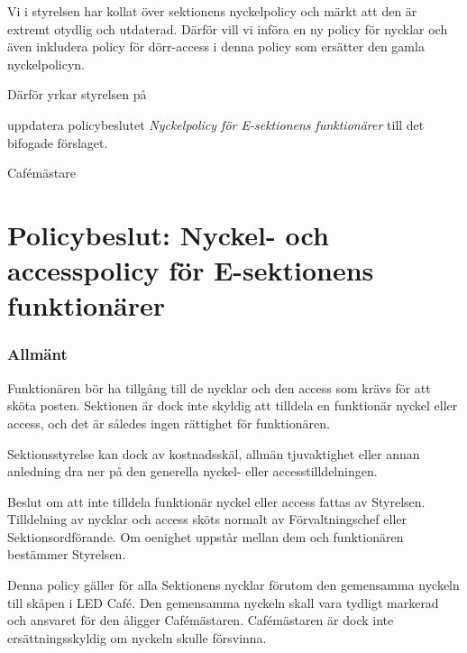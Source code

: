 \documentclass[../_main/handlingar.tex]{subfiles}
\begin{document}
Vi i styrelsen har kollat över sektionens nyckelpolicy och märkt att den är extremt otydlig och utdaterad. Därför vill vi införa en ny policy för nycklar och även inkludera policy för dörr-access i denna policy som ersätter den gamla nyckelpolicyn.

Därför yrkar styrelsen på

\begin{attsatser}
	\att uppdatera policybeslutet \emph{Nyckelpolicy för E-sektionens funktionärer} till det bifogade förslaget.
\end{attsatser}

\begin{signatures}{1}
	\ist
	\signature{Elin Johansson}{Cafémästare}
\end{signatures}

\newpage
\section*{Policybeslut: Nyckel- och accesspolicy för E-sektionens funktionärer}
\subsubsection*{Allmänt}
Funktionären bör ha tillgång till de nycklar och den access som krävs för att sköta posten. Sektionen är dock inte skyldig att tilldela en funktionär nyckel eller access, och det är således ingen rättighet för funktionären.

Sektionsstyrelse kan dock av kostnadsskäl, allmän tjuvaktighet eller annan anledning dra ner på den generella nyckel- eller accesstilldelningen.

Beslut om att inte tilldela funktionär nyckel eller access fattas av Styrelsen. Tilldelning av nycklar och access sköts normalt av Förvaltningschef eller Sektionsordförande. Om oenighet uppstår mellan dem och funktionären bestämmer Styrelsen.

Denna policy gäller för alla Sektionens nycklar förutom den gemensamma nyckeln till skåpen i LED Café. Den gemensamma nyckeln skall vara tydligt markerad och ansvaret för den åligger Cafémästaren. Cafémästaren är dock inte ersättningsskyldig om nyckeln skulle försvinna.
\end{document}
